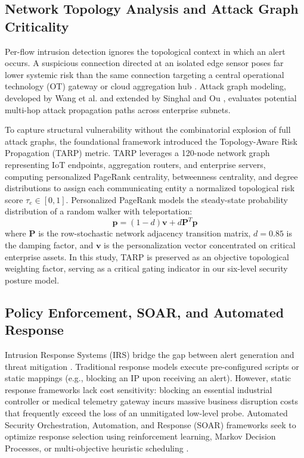 \documentclass[journal,10pt,onecolumn]{IEEEtran}
\begin{document}
\subsection{Network Topology Analysis and Attack Graph Criticality}
Per-flow intrusion detection ignores the topological context in which an alert occurs. A suspicious connection directed at an isolated edge sensor poses far lower systemic risk than the same connection targeting a central operational technology (OT) gateway or cloud aggregation hub \cite{11, 13, 14}. Attack graph modeling, developed by Wang et al. \cite{12} and extended by Singhal and Ou \cite{14}, evaluates potential multi-hop attack propagation paths across enterprise subnets.

To capture structural vulnerability without the combinatorial explosion of full attack graphs, the foundational framework \cite{1} introduced the Topology-Aware Risk Propagation (TARP) metric. TARP leverages a 120-node network graph representing IoT endpoints, aggregation routers, and enterprise servers, computing personalized PageRank centrality, betweenness centrality, and degree distributions to assign each communicating entity a normalized topological risk score $\tau_e \in [0, 1]$. Personalized PageRank models the steady-state probability distribution of a random walker with teleportation:
$$\mathbf{p} = (1 - d) \mathbf{v} + d \mathbf{P}^T \mathbf{p}$$
where $\mathbf{P}$ is the row-stochastic network adjacency transition matrix, $d = 0.85$ is the damping factor, and $\mathbf{v}$ is the personalization vector concentrated on critical enterprise assets. In this study, TARP is preserved as an objective topological weighting factor, serving as a critical gating indicator in our six-level security posture model.


\subsection{Policy Enforcement, SOAR, and Automated Response}
Intrusion Response Systems (IRS) bridge the gap between alert generation and threat mitigation \cite{25, 26, 27}. Traditional response models execute pre-configured scripts or static mappings (e.g., blocking an IP upon receiving an alert). However, static response frameworks lack cost sensitivity: blocking an essential industrial controller or medical telemetry gateway incurs massive business disruption costs that frequently exceed the loss of an unmitigated low-level probe. Automated Security Orchestration, Automation, and Response (SOAR) frameworks seek to optimize response selection using reinforcement learning, Markov Decision Processes, or multi-objective heuristic scheduling \cite{25, 26}.
\end{document}
